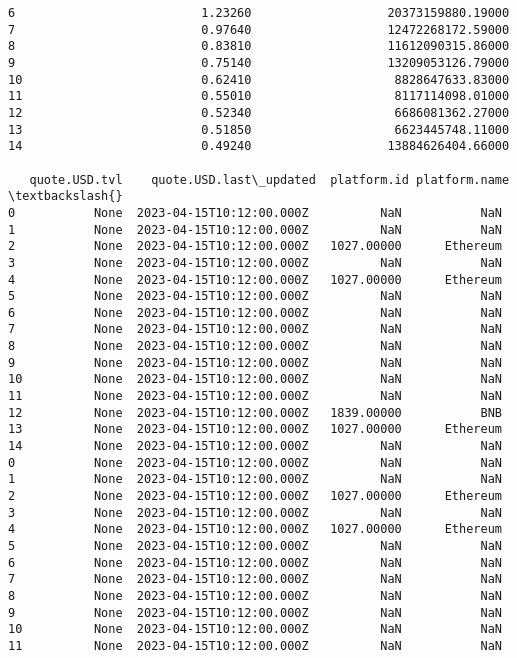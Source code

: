 \documentclass[11pt]{article}
\begin{document}
\begin{tcolorbox}[breakable, size=fbox, boxrule=.5pt, pad at break*=1mm, opacityfill=0]
\begin{Verbatim}[commandchars=\\\{\}]
6                          1.23260                   20373159880.19000
7                          0.97640                   12472268172.59000
8                          0.83810                   11612090315.86000
9                          0.75140                   13209053126.79000
10                         0.62410                    8828647633.83000
11                         0.55010                    8117114098.01000
12                         0.52340                    6686081362.27000
13                         0.51850                    6623445748.11000
14                         0.49240                   13884626404.66000

   quote.USD.tvl    quote.USD.last\_updated  platform.id platform.name  \textbackslash{}
0           None  2023-04-15T10:12:00.000Z          NaN           NaN
1           None  2023-04-15T10:12:00.000Z          NaN           NaN
2           None  2023-04-15T10:12:00.000Z   1027.00000      Ethereum
3           None  2023-04-15T10:12:00.000Z          NaN           NaN
4           None  2023-04-15T10:12:00.000Z   1027.00000      Ethereum
5           None  2023-04-15T10:12:00.000Z          NaN           NaN
6           None  2023-04-15T10:12:00.000Z          NaN           NaN
7           None  2023-04-15T10:12:00.000Z          NaN           NaN
8           None  2023-04-15T10:12:00.000Z          NaN           NaN
9           None  2023-04-15T10:12:00.000Z          NaN           NaN
10          None  2023-04-15T10:12:00.000Z          NaN           NaN
11          None  2023-04-15T10:12:00.000Z          NaN           NaN
12          None  2023-04-15T10:12:00.000Z   1839.00000           BNB
13          None  2023-04-15T10:12:00.000Z   1027.00000      Ethereum
14          None  2023-04-15T10:12:00.000Z          NaN           NaN
0           None  2023-04-15T10:12:00.000Z          NaN           NaN
1           None  2023-04-15T10:12:00.000Z          NaN           NaN
2           None  2023-04-15T10:12:00.000Z   1027.00000      Ethereum
3           None  2023-04-15T10:12:00.000Z          NaN           NaN
4           None  2023-04-15T10:12:00.000Z   1027.00000      Ethereum
5           None  2023-04-15T10:12:00.000Z          NaN           NaN
6           None  2023-04-15T10:12:00.000Z          NaN           NaN
7           None  2023-04-15T10:12:00.000Z          NaN           NaN
8           None  2023-04-15T10:12:00.000Z          NaN           NaN
9           None  2023-04-15T10:12:00.000Z          NaN           NaN
10          None  2023-04-15T10:12:00.000Z          NaN           NaN
11          None  2023-04-15T10:12:00.000Z          NaN           NaN

\end{Verbatim}
\end{tcolorbox}
\end{document}
